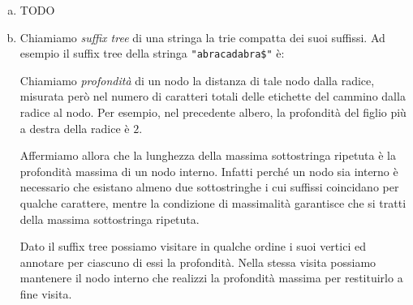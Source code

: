 \begin{enumerate}[(a)]
  \item TODO
  \item Chiamiamo \emph{suffix tree} di una stringa la trie compatta dei suoi
  suffissi. Ad esempio il suffix tree della stringa 
  \texttt{\string"abracadabra\$\string"} \`e:
  \begin{figure}[H]
    \centering
  \end{figure}
  
  Chiamiamo \emph{profondit\`a} di un nodo la distanza di tale nodo dalla 
  radice, misurata per\`o nel numero di caratteri totali delle etichette
  del cammino dalla radice al nodo. Per esempio, nel precedente albero, la 
  profondit\`a del figlio pi\`u a destra della radice \`e \(2\).
  
  Affermiamo allora che la lunghezza della massima sottostringa ripetuta \`e
  la profondit\`a massima di un nodo interno. Infatti perché un nodo sia
  interno \`e necessario che esistano almeno due sottostringhe i cui suffissi
  coincidano per qualche carattere, mentre la condizione di massimalit\`a
  garantisce che si tratti della massima sottostringa ripetuta.
  
  Dato il suffix tree possiamo visitare in qualche ordine i suoi vertici ed
  annotare per ciascuno di essi la profondit\`a. Nella stessa visita possiamo 
  mantenere il nodo interno che realizzi la profondit\`a massima per
  restituirlo a fine visita.
\end{enumerate}

